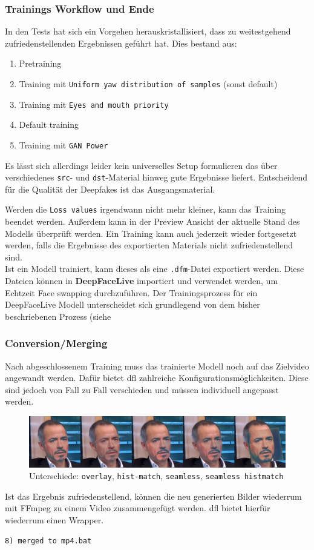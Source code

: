 \subsubsection{Trainings Workflow und Ende}
In den Tests hat sich ein Vorgehen herauskristallisiert, dass zu weitestgehend zufriedenstellenden Ergebnissen geführt hat.
Dies bestand aus:
\begin{enumerate}
    \item Pretraining
    \item Training mit \texttt{Uniform yaw distribution of samples} (sonst default)
    \item Training mit \texttt{Eyes and mouth priority}
    \item Default training
    \item Training mit \texttt{GAN Power}
\end{enumerate}
Es lässt sich allerdings leider kein universelles Setup formulieren das über verschiedenes \texttt{src}- und \texttt{dst}-Material hinweg gute Ergebnisse liefert.
Entscheidend für die Qualität der Deepfakes ist das Ausgangsmaterial.

Werden die \texttt{Loss values} irgendwann nicht mehr kleiner, kann das Training beendet werden.
Außerdem kann in der Preview Ansicht der aktuelle Stand des Modells überprüft werden.
Ein Training kann auch jederzeit wieder fortgesetzt werden, falls die Ergebnisse des exportierten Materials nicht zufriedenstellend sind.\\

Ist ein Modell trainiert, kann dieses als eine \texttt{.dfm}-Datei exportiert werden.
Diese Dateien können in \textbf{DeepFaceLive} importiert und verwendet werden, um Echtzeit Face swapping durchzuführen.
Der Trainingsprozess für ein DeepFaceLive Modell unterscheidet sich grundlegend von dem bisher beschriebenen Prozess (siehe %

\subsubsection{Conversion/Merging}
Nach abgeschlossenem Training muss das trainierte Modell noch auf das Zielvideo angewandt werden.
Dafür bietet \gls{dfl} zahlreiche Konfigurationsmöglichkeiten.
Diese sind jedoch von Fall zu Fall verschieden und müssen individuell angepasst werden.
\begin{figure}
    \center
    \includegraphics[width=\textwidth]{Bilder/DFL/merger-comparison}
    \caption{Unterschiede: \texttt{overlay}, \texttt{hist-match}, \texttt{seamless}, \texttt{seamless histmatch}}
    \label{fig:merger-comparison}
\end{figure}

Ist das Ergebnis zufriedenstellend, können die neu generierten Bilder wiederrum mit FFmpeg zu einem Video zusammengefügt werden.
\gls{dfl} bietet hierfür wiederrum einen Wrapper.
\begin{lstlisting}[numbers=none,label={lst:merged-to-mp4}]
    8) merged to mp4.bat
\end{lstlisting}